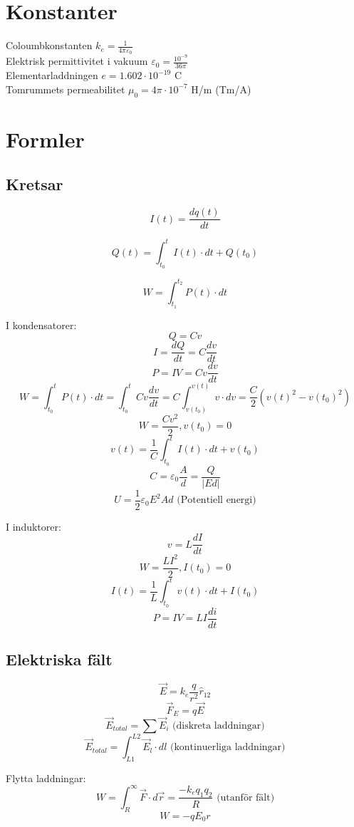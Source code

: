 \documentclass{article}
\begin{document}
\section{Konstanter}

Coloumbkonstanten \tab \( k_e = \frac{1}{4 \pi \varepsilon_0} \)
\\
Elektrisk permittivitet i vakuum \tab \( \varepsilon_0 = \frac{10^{-9}}{36 \pi} \)
\\
Elementarladdningen \tab \( e = 1.602 \cdot 10^{-19} \) C
\\
Tomrummets permeabilitet \tab \( \mu_0 = 4\pi \cdot 10^{-7} \) H/m (Tm/A)

\section{Formler}
\subsection{Kretsar}
\[ I(t) = \frac{dq(t)}{dt} \]

\[ Q(t) = \int_{t_0}^t I(t) \cdot dt + Q(t_0) \]

\[ W = \int_{t_1}^{t_2} P(t) \cdot dt \]

I kondensatorer:
\[ Q = Cv \]
\[ I = \frac{dQ}{dt} = C \frac{dv}{dt} \]
\[ P = IV = Cv \frac{dv}{dt} \]
\[ W = \int_{t_0}^t P(t) \cdot dt = \int_{t_0}^t Cv \frac{dv}{dt} = C \int_{v(t_0)}^{v(t)} v \cdot dv = \frac{C}{2}(v(t)^2 - v(t_0)^2) \]
\[ W = \frac{Cv^2}{2}, v(t_0) = 0 \]
\[ v(t) = \frac{1}{C} \int_{t_0}^t I(t)\cdot dt + v(t_0) \]
\[ C = \varepsilon_0 \frac{A}{d} = \frac{Q}{|Ed|} \]
\[ U = \frac{1}{2} \varepsilon_0 E^2Ad \textrm{ (Potentiell energi)} \]

I induktorer:
\[ v = L \frac{dI}{dt} \]
\[ W = \frac{LI^2}{2}, I(t_0) = 0 \]
\[ I(t) = \frac{1}{L} \int_{t_0}^t v(t) \cdot dt + I(t_0) \]
\[ P = IV = LI \frac{di}{dt} \]

\subsection{Elektriska fält}
\[ \vec{E} = k_e \frac{q}{r^2} \hat{r}_{12} \]
\[ \vec{F}_E  = q \vec{E} \]
\[ \vec{E}_{total} = \sum \vec{E}_i \textrm{ (diskreta laddningar)} \]
\[ \vec{E}_{total} = \int_{L1}^{L2} \vec{E}_l \cdot dl \textrm{ (kontinuerliga laddningar)} \]

Flytta laddningar:
\[ W =\int_R^{\infty} \vec{F} \cdot d\vec{r} = \frac{-k_eq_1q_2}{R} \textrm{ (utanför fält)} \]
\[ W = -qE_0r \]
\end{document}
